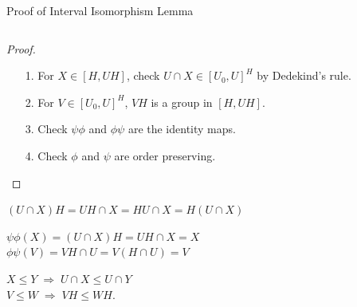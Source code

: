 \documentclass[xcolor=dvipsnames,11pt,hide notes]{beamer}
\theoremstyle{definition}
\theoremstyle{remark}
\newtheorem*{computations}{Computations}
\numberwithin{theorem}{section}
\numberwithin{claim}{section}
\numberwithin{equation}{section}
\numberwithin{conjecture}{section}
\begin{document}
\begin{frame}[fragile,label=ProofOfIntervalIsomorphism,shrink=5]{Proof of Interval Isomorphism Lemma}
\begin{columns}
\begin{column}{0.55\textwidth}
    \end{column}
  \end{columns}
\vskip5mm
      \begin{proof}
        \begin{itemize}
        \item[1.] For $X\in [H, UH]$,
          check $U\cap X \in [U_0, U]^H$ by Dedekind's rule.\vskip6pt
        \item[2.] For $V\in [U_0, U]^H$, $VH$ is a group in $[H, UH]$.\vskip6pt
        \item[3.]  Check $\psi \phi$ and $\phi \psi$ are the identity maps. \vskip6pt
        \item[4.] Check $\phi$ and $\psi$ are order preserving.
        \end{itemize}
      \end{proof}

\end{frame}

\begin{frame}[fragile,label=ComputationsForProofOfIntervalIsomorphism,shrink=5]{}
 $(U\cap X) H = UH \cap X= HU \cap X = H(U \cap X)$
\end{frame}
\begin{frame}[fragile,label=ComputationsForProofOfIntervalIsomorphism,shrink=5]{}
  $\psi \phi (X) = (U\cap X)H =UH \cap X = X$\\[4pt]
  $\phi \psi(V)= VH \cap U =V(H\cap U)= V$
\end{frame}
\begin{frame}[fragile,label=ComputationsForProofOfIntervalIsomorphism,shrink=5]{}
$X\leq Y \; \Rightarrow \; U\cap X \leq U\cap Y$\\[4pt]
  $V\leq W \; \Rightarrow \; VH \leq WH$.
\end{frame}
\end{document}
